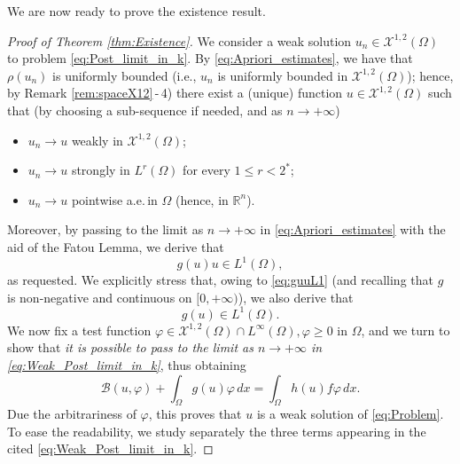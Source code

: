 \documentclass[11pt,a4paper]{amsart}
\def \R {\mathbb{R}}
\theoremstyle{definition}
\theoremstyle{plain}
\numberwithin{equation}{section}
\begin{document}
{  
We are now ready to prove the existence result.
\begin{proof}[Proof of Theorem \ref{thm:Existence}]
We consider a weak solution $u_n\in\mathcal{X}^{1,2}(\Omega)$ to problem \eqref{eq:Post_limit_in_k}.
 By \eqref{eq:Apriori_estimates}, we have that $\rho(u_n)$ is uniformly bounded (i.e., $u_n$ is uniformly bounded in $\mathcal{X}^{1,2}(\Omega)$); hence, by Remark \ref{rem:spaceX12}\,-\,4) there exist a (unique)
 function $u \in \mathcal{X}^{1,2}(\Omega)$ such that
 (by choosing a sub-sequence if needed, and as $n\to+\infty$)
\begin{itemize}
\item[a)] $u_n \to u$ weakly in $\mathcal{X}^{1,2}(\Omega)$;
\item[b)] $u_n \to u$  strongly in $L^{r}(\Omega)$ for every $1\leq r <2^{\ast}$;
\item[c)] $u_n\to u$ 
 pointwise a.e.\,in $\Omega$ (hence, in $\R^n$).
\end{itemize} 
Moreover, by passing to the limit as $n \to +\infty$ in \eqref{eq:Apriori_estimates} with the aid
of the Fatou Lemma, we derive that
\begin{equation} \label{eq:guuL1}
 g(u)u\in L^{1}(\Omega),
 \end{equation}
as requested. We explicitly stress that, owing to 
\eqref{eq:guuL1} (and recalling that $g$ is non-negative
and continuous on $[0,+\infty)$), we also derive that 
$$g(u)\in L^1(\Omega).$$
We now fix a test function $\varphi\in \mathcal{X}^{1,2}(\Omega)\cap L^\infty(\Omega),
\varphi\geq 0$ in $\Omega$,
and we turn to show that \emph{it is possible to pass to the limit as $n\to+\infty$ in \eqref{eq:Weak_Post_limit_in_k}}, thus obtaining
\begin{equation}  \label{eq:finalGoalWeaku}
 \mathcal{B}(u,\varphi)+\int_{\Omega}g(u)\varphi\,dx = \int_{\Omega} h(u)f\varphi\,dx.
 \end{equation}
Due the arbitrariness of $\varphi$, this proves that $u$ is a weak solution of 
\eqref{eq:Problem}. To ease the readability,
we study separately the three terms appearing in the cited \eqref{eq:Weak_Post_limit_in_k}.
\medskip


\end{proof}}
\end{document}
